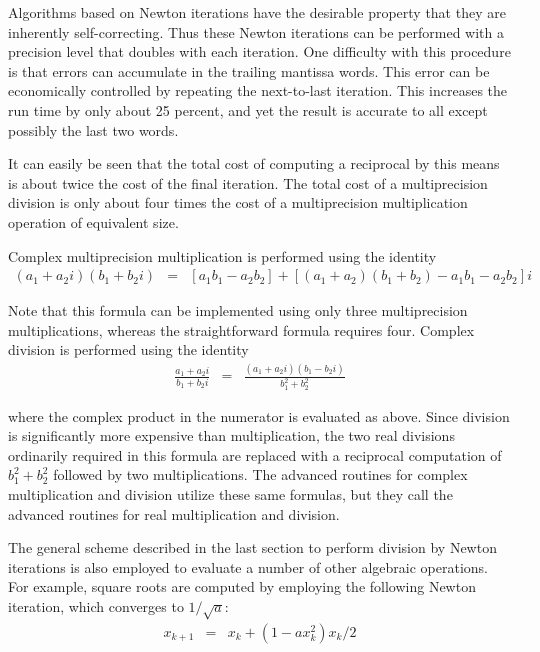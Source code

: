 Algorithms based on Newton iterations have the desirable property that
they are inherently self-correcting.  Thus these Newton iterations can
be performed with a precision level that doubles with each iteration.
One difficulty with this procedure is that errors can accumulate in
the trailing mantissa words.  This error can be economically
controlled by repeating the next-to-last iteration.  This increases
the run time by only about 25 percent, and yet the result is accurate
to all except possibly the last two words.

It can easily be seen that the total cost of computing a reciprocal by
this means is about twice the cost of the final iteration.  The total
cost of a multiprecision division is only about four times the cost of
a multiprecision multiplication operation of equivalent size.

\vspace{2ex}

Complex multiprecision multiplication is performed using the identity
\begin{eqnarray*}
(a_1 + a_2 i) (b_1 + b_2 i) &=& [a_1 b_1 - a_2 b_2] + 
   [(a_1 + a_2) (b_1 + b_2) - a_1 b_1 - a_2 b_2] i
\end{eqnarray*}

\noindent
Note that this formula can be implemented using only three
multiprecision multiplications, whereas the straightforward formula
requires four.  Complex division is performed using the identity
\begin{eqnarray*}
\frac{a_1 + a_2 i}{b_1 + b_2 i} &=& \frac{(a_1 + a_2 i)(b_1 - b_2 i)}
   {b_1^2 + b_2^2}
\end{eqnarray*}

\noindent
where the complex product in the numerator is evaluated as above.
Since division is significantly more expensive than multiplication,
the two real divisions ordinarily required in this formula are
replaced with a reciprocal computation of $b_1^2 + b_2^2$ followed by
two multiplications.  The advanced routines for complex multiplication
and division utilize these same formulas, but they call the advanced
routines for real multiplication and division.

The general scheme described in the last section to perform division
by Newton iterations is also employed to evaluate a number of other
algebraic operations.  For example, square roots are computed by
employing the following Newton iteration, which converges to $1 /
\sqrt{a}$:
\begin{eqnarray*}
x_{k+1} &=& x_k + (1 - a x_k^2) x_k / 2
\end{eqnarray*}

